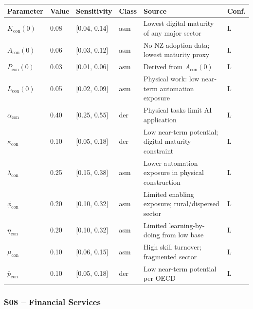 \documentclass[11pt,a4paper]{article}
\begin{document}
\begin{center}
\begin{tabular}{llllll}
\toprule
Parameter & Value & Sensitivity & Class & Source & Conf.\\
\midrule
$K_{\text{con}}(0)$ & 0.08 & [0.04, 0.14] & asm & Lowest digital maturity of any major sector & L \\
$A_{\text{con}}(0)$ & 0.06 & [0.03, 0.12] & asm & No NZ adoption data; lowest maturity proxy & L \\
$P_{\text{con}}(0)$ & 0.03 & [0.01, 0.06] & asm & Derived from $A_{\text{con}}(0)$ & L \\
$L_{\text{con}}(0)$ & 0.05 & [0.02, 0.09] & asm & Physical work: low near-term automation exposure & L \\
$\alpha_{\text{con}}$ & 0.40 & [0.25, 0.55] & der & Physical tasks limit AI application & L \\
$\kappa_{\text{con}}$ & 0.10 & [0.05, 0.18] & der & Low near-term potential; digital maturity constraint & L \\
$\lambda_{\text{con}}$ & 0.25 & [0.15, 0.38] & asm & Lower automation exposure in physical construction & L \\
$\phi_{\text{con}}$ & 0.20 & [0.10, 0.32] & asm & Limited enabling exposure; rural/dispersed sector & L \\
$\eta_{\text{con}}$ & 0.20 & [0.10, 0.32] & asm & Limited learning-by-doing from low base & L \\
$\mu_{\text{con}}$ & 0.10 & [0.06, 0.15] & asm & High skill turnover; fragmented sector & L \\
$\bar{p}_{\text{con}}$ & 0.10 & [0.05, 0.18] & der & Low near-term potential per OECD & L \\
\bottomrule
\end{tabular}
\end{center}

\subsubsection*{S08 -- Financial Services}
\end{document}
